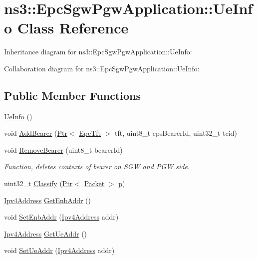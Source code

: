\hypertarget{classns3_1_1EpcSgwPgwApplication_1_1UeInfo}{}\section{ns3\+:\+:Epc\+Sgw\+Pgw\+Application\+:\+:Ue\+Info Class Reference}
\label{classns3_1_1EpcSgwPgwApplication_1_1UeInfo}


Inheritance diagram for ns3\+:\+:Epc\+Sgw\+Pgw\+Application\+:\+:Ue\+Info\+:


Collaboration diagram for ns3\+:\+:Epc\+Sgw\+Pgw\+Application\+:\+:Ue\+Info\+:
\subsection*{Public Member Functions}
\begin{DoxyCompactItemize}
\item 
\hyperlink{classns3_1_1EpcSgwPgwApplication_1_1UeInfo_a0877eee397e2e94e49e7f9d5f228d1bf}{Ue\+Info} ()
\item 
void \hyperlink{classns3_1_1EpcSgwPgwApplication_1_1UeInfo_ae2e2fad6ede5140288c73c926f0022bd}{Add\+Bearer} (\hyperlink{classns3_1_1Ptr}{Ptr}$<$ \hyperlink{classns3_1_1EpcTft}{Epc\+Tft} $>$ tft, uint8\+\_\+t eps\+Bearer\+Id, uint32\+\_\+t teid)
\item 
void \hyperlink{classns3_1_1EpcSgwPgwApplication_1_1UeInfo_a7820223dbd4ef797a7b766cdb10f768e}{Remove\+Bearer} (uint8\+\_\+t bearer\+Id)
\begin{DoxyCompactList}\small\item\em Function, deletes contexts of bearer on S\+GW and P\+GW side. \end{DoxyCompactList}\item 
uint32\+\_\+t \hyperlink{classns3_1_1EpcSgwPgwApplication_1_1UeInfo_a806194d3d59b952120e144302b11299a}{Classify} (\hyperlink{classns3_1_1Ptr}{Ptr}$<$ \hyperlink{classns3_1_1Packet}{Packet} $>$ \hyperlink{lte__link__budget__x2__handover__measures_8m_ac9de518908a968428863f829398a4e62}{p})
\item 
\hyperlink{classns3_1_1Ipv4Address}{Ipv4\+Address} \hyperlink{classns3_1_1EpcSgwPgwApplication_1_1UeInfo_a408054f68f70e29d233a41e94c45a1ec}{Get\+Enb\+Addr} ()
\item 
void \hyperlink{classns3_1_1EpcSgwPgwApplication_1_1UeInfo_aed82030515ce881c2b2bb34fbd939b48}{Set\+Enb\+Addr} (\hyperlink{classns3_1_1Ipv4Address}{Ipv4\+Address} addr)
\item 
\hyperlink{classns3_1_1Ipv4Address}{Ipv4\+Address} \hyperlink{classns3_1_1EpcSgwPgwApplication_1_1UeInfo_a0337f3951b3aea6430a8ac049c850aaf}{Get\+Ue\+Addr} ()
\item 
void \hyperlink{classns3_1_1EpcSgwPgwApplication_1_1UeInfo_a64105f62a463aebfab676e60570ca522}{Set\+Ue\+Addr} (\hyperlink{classns3_1_1Ipv4Address}{Ipv4\+Address} addr)
\end{DoxyCompactItemize}
